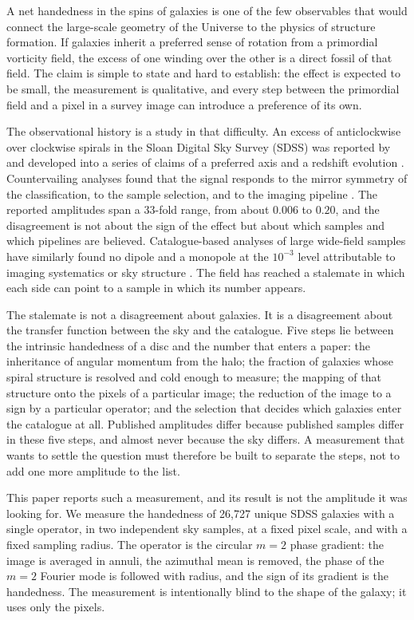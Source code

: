 \documentclass[preprint,12pt,authoryear]{elsarticle}
\begin{document}
A net handedness in the spins of galaxies is one of the few observables that would connect the
large-scale geometry of the Universe to the physics of structure formation. If galaxies inherit a
preferred sense of rotation from a primordial vorticity field, the excess of one winding over the
other is a direct fossil of that field. The claim is simple to state and hard to establish: the
effect is expected to be small, the measurement is qualitative, and every step between the
primordial field and a pixel in a survey image can introduce a preference of its own.

The observational history is a study in that difficulty. An excess of anticlockwise over clockwise
spirals in the Sloan Digital Sky Survey (SDSS) was reported by \citet{longo2011} and
developed into a series of claims of a preferred axis and a redshift evolution
\citep{shamir2012, shamir2017, shamir2024}. Countervailing analyses found that the signal responds
to the mirror symmetry of the classification, to the sample selection, and to the imaging pipeline
\citep{land2008, hayes2017, iye2020}. The reported amplitudes span a 33-fold range, from
about $0.006$ to $0.20$, and the disagreement is not about the sign of the effect but about which
samples and which pipelines are believed. Catalogue-based analyses of large wide-field samples have
similarly found no dipole and a monopole at the $10^{-3}$ level attributable to imaging systematics
or sky structure \citep{desi2026}. The field has reached a stalemate in which each side can point to a sample in
which its number appears.

The stalemate is not a disagreement about galaxies. It is a disagreement about the transfer
function between the sky and the catalogue. Five steps lie between the intrinsic handedness of a
disc and the number that enters a paper: the inheritance of angular momentum from the halo; the
fraction of galaxies whose spiral structure is resolved and cold enough to measure; the mapping of
that structure onto the pixels of a particular image; the reduction of the image to a sign by a
particular operator; and the selection that decides which galaxies enter the catalogue at all.
Published amplitudes differ because published samples differ in these five steps, and almost never
because the sky differs. A measurement that wants to settle the question must therefore be built
to separate the steps, not to add one more amplitude to the list.

This paper reports such a measurement, and its result is not the amplitude it was looking for. We
measure the handedness of 26,727 unique SDSS galaxies with a single operator, in two independent
sky samples, at a fixed pixel scale, and with a fixed sampling radius. The operator is the
circular $m=2$ phase gradient: the image is averaged in annuli, the azimuthal mean is removed, the
phase of the $m=2$ Fourier mode is followed with radius, and the sign of its gradient is the
handedness. The measurement is intentionally blind to the shape of the galaxy; it uses only the
pixels.
\end{document}
